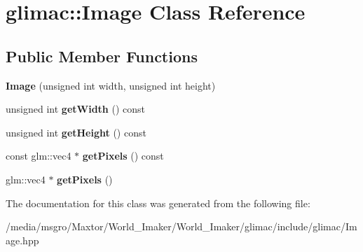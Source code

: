 \hypertarget{classglimac_1_1Image}{}\section{glimac\+:\+:Image Class Reference}
\label{classglimac_1_1Image}
\subsection*{Public Member Functions}
\begin{DoxyCompactItemize}
\item 
\mbox{\label{classglimac_1_1Image_a8d0769d9756924f57b740e48e9fb09f6}} 
{\bfseries Image} (unsigned int width, unsigned int height)
\item 
\mbox{\label{classglimac_1_1Image_a23bc966575ee67b85fc575631b035026}} 
unsigned int {\bfseries get\+Width} () const
\item 
\mbox{\label{classglimac_1_1Image_a0a2afce624e3df2b12d7d76ba0d31c42}} 
unsigned int {\bfseries get\+Height} () const
\item 
\mbox{\label{classglimac_1_1Image_af2cdd4b884831808f5ecba70209c2f95}} 
const glm\+::vec4 $\ast$ {\bfseries get\+Pixels} () const
\item 
\mbox{\label{classglimac_1_1Image_a679f8ae515ad9607faa762e1e2105285}} 
glm\+::vec4 $\ast$ {\bfseries get\+Pixels} ()
\end{DoxyCompactItemize}


The documentation for this class was generated from the following file\+:\begin{DoxyCompactItemize}
\item 
/media/msgro/\+Maxtor/\+World\+\_\+\+Imaker/\+World\+\_\+\+Imaker/glimac/include/glimac/Image.\+hpp\end{DoxyCompactItemize}
